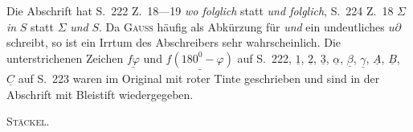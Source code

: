 Die Abschrift hat S.~222 Z.~18—19 \emph{wo folglich} statt \emph{und folglich}, S.~224 Z.~18 $\Sigma$ \emph{in} $S$ statt $\Sigma$ \emph{und} $S$. Da \textsc{Gauss} häufig als Abkürzung für \emph{und} ein undeutliches $u\partial$ schreibt, so ist ein Irrtum des Abschreibers sehr wahrscheinlich. Die unterstrichenen Zeichen $\underline{f\varphi}$ und $\underline{f(180^{0}-\varphi)}$ auf S.~222, $\underline{1}$, $\underline{2}$, $\underline{3}$, $\underline{\alpha}$, $\underline{\beta}$, $\underline{\gamma}$, $\underline{A}$, $\underline{B}$, $\underline{C}$ auf S.~223 waren im Original mit roter Tinte geschrieben und sind in der Abschrift mit Bleistift wiedergegeben.
\begin{flushright}\textsc{Stäckel.}\end{flushright}
\par\endgroup
